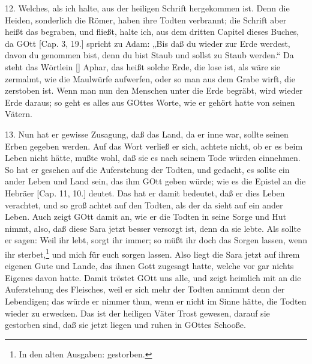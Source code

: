 12. Welches, als ich halte, aus der heiligen Schrift hergekommen ist. Denn die Heiden, sonderlich die Römer, haben ihre Todten verbrannt; die Schrift aber heißt das begraben, und fließt, halte ich, aus dem dritten Capitel dieses Buches, da GOtt [Cap. 3, 19.] spricht zu Adam: „Bis daß du wieder zur Erde werdest, davon du genommen bist, denn du bist Staub und sollst zu Staub werden.“ Da steht das Wörtlein [] Aphar, das heißt solche Erde, die lose ist, als wäre sie zermalmt, wie die Maulwürfe aufwerfen, oder so man aus dem Grabe wirft, die zerstoben ist. Wenn man nun den Menschen unter die Erde begräbt, wird wieder Erde daraus; so geht es alles aus GOttes Worte, wie er gehört hatte von seinen Vätern.

13. Nun hat er gewisse Zusagung, daß das Land, da er inne war, sollte seinen Erben gegeben werden. Auf das Wort verließ er sich, achtete nicht, ob er es beim Leben nicht hätte, mußte wohl, daß sie es nach seinem Tode würden einnehmen. So hat er gesehen auf die Auferstehung der Todten, und gedacht, es sollte ein ander Leben und Land sein, das ihm GOtt geben würde; wie es die Epistel an die Hebräer [Cap. 11, 10.] deutet. Das hat er damit bedeutet, daß er dies Leben verachtet, und so groß achtet auf den Todten, als der da sieht auf ein ander Leben. Auch zeigt GOtt damit an, wie er die Todten in seine Sorge und Hut nimmt, also, daß diese Sara jetzt besser versorgt ist, denn da sie lebte. Als sollte er sagen: Weil ihr lebt, sorgt ihr immer; so müßt ihr doch das Sorgen lassen, wenn ihr sterbet,\footnote{In den alten Ausgaben: gestorben.} und mich für euch sorgen lassen. Also liegt die Sara jetzt auf ihrem eigenen Gute und Lande, das ihnen
Gott zugesagt hatte, welche vor gar nichts Eigenes davon hatte. Damit tröstet GOtt uns alle, und zeigt heimlich mit an die Auferstehung des Fleisches, weil er sich mehr der Todten annimmt denn der Lebendigen; das würde er nimmer thun, wenn er nicht im Sinne hätte, die Todten wieder zu erwecken. Das ist der heiligen Väter Trost gewesen, darauf sie gestorben sind, daß sie jetzt liegen und ruhen in GOttes Schooße.

